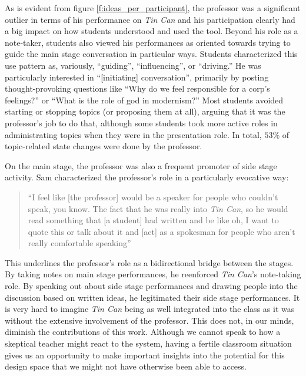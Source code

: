 
As is evident from figure \ref{f:ideas_per_participant}, the professor was a significant outlier in terms of his performance on \emph{Tin Can} and his participation clearly had a big impact on how students understood and used the tool. Beyond his role as a note-taker, students also viewed his performances as oriented towards trying to guide the main stage conversation in particular ways. Students characterized this use pattern as, variously, ``guiding'', ``influencing'', or ``driving.'' He was particularly interested in ``[initiating] conversation'', primarily by posting thought-provoking questions like ``Why do we feel responsible for a corp's feelings?'' or ``What is the role of god in modernism?'' Most students avoided starting or stopping topics (or proposing them at all), arguing that it was the professor's job to do that, although some students took more active roles in administrating topics when they were in the presentation role. In total, $53\%$ of topic-related state changes were done by the professor. 

On the main stage, the professor was also a frequent promoter of side stage activity. Sam characterized the professor's role in a particularly evocative way:

\begin{quote}
``I feel like [the professor] would be a speaker for people who couldn't speak, you know.  The fact that he was really into \emph{Tin Can}, so he would read something that [a student] had written and be like oh, I want to quote this or talk about it and [act] as a spokesman for people who aren't really comfortable speaking''
\end{quote}

This underlines the professor's role as a bidirectional bridge between the stages. By taking notes on main stage performances, he reenforced \emph{Tin Can}'s note-taking role. By speaking out about side stage performances and drawing people into the discussion based on written ideas, he legitimated their side stage performances. It is very hard to imagine \emph{Tin Can} being as well integrated into the class as it was without the extensive involvement of the professor. This does not, in our minds, diminish the contributions of this work. Although we cannot speak to how a skeptical teacher might react to the system, having a fertile classroom situation gives us an opportunity to make important insights into the potential for this design space that we might not have otherwise been able to access.

